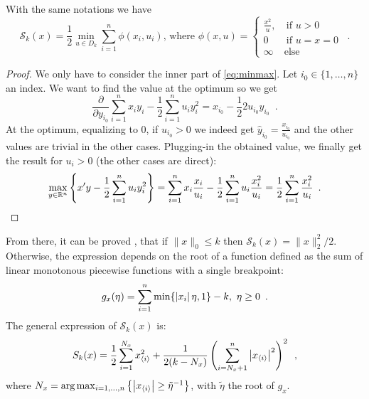 \begin{proposition} With the same notations we have 
\begin{equation}\mathcal{S}_k(x) = \frac{1}{2}\min_{u\in D_k} \sum_{i=1}^n \phi(x_i, u_i)\text{, where }
\phi(x,u)=\begin{cases}\frac{x^2}{u},&\ \text{if }u>0\\ 0&\ \text{if }u=x=0\\ \infty &\text{else} \end{cases}\enspace.\end{equation}
\end{proposition}
\begin{proof}
We only have to consider the inner part of \eqref{eq:minmax}. Let $i_0\in\{1,\dots,n\}$ an index. We want to find the value at the optimum so we get
\[ \frac{\partial}{\partial y_{i_0}} \sum_{i=1}^n x_iy_i -\frac{1}{2}\sum_{i=1}^n u_iy_i^2 = x_{i_0} - \frac{1}{2}2u_{i_0}y_{i_0}\enspace.\]
At the optimum, equalizing to $0$, if $u_{i_0}>0$ we indeed get $\hat y_{i_0} = \frac{x_{i_0}}{u_{i_0}}$ and the other values are trivial in the other cases. Plugging-in the obtained value, we finally get the result for $u_i>0$ (the other cases are direct):
\[\max_{y\in\mathbb{R}^n}\left\{x'y - \frac{1}{2}\sum_{i=1}^nu_iy_i^2\right\} = \sum_{i=1}^nx_i \frac{x_i}{u_i} - \frac{1}{2}\sum_{i=1}^n u_i \frac{x_i^2}{u_i} = \frac{1}{2}\sum_{i=1}^n \frac{x_i^2}{u_i}\enspace.\]
\end{proof}

From there, it can be proved \cite{beck}, that if $\|x\|_0\leq k$ then $\mathcal{S}_k(x)=\|x\|_2^2 /2$. Otherwise, the expression depends on the root of a function defined as the sum of linear monotonous piecewise functions with a single breakpoint:
\[g_x(\eta)=\sum_{i=1}^n \min\{\left|x_i\right|\eta,1\} - k,\ \eta\geq 0\enspace.\]
The general expression of $\mathcal{S}_k(x)$ is:
\begin{equation}
    S_k(x)=\frac{1}{2}\sum_{i=1}^{N_x} x_{\langle i \rangle}^2 + \frac{1}{2(k- N_x)}\left(\sum_{i=N_x+1}^n\left|x_{\langle i\rangle}\right|^2\right)^2\enspace,
\end{equation}
where $N_x=\arg\max_{i=1,\dots,n}\left\{\left|x_{\langle i\rangle}\right|\geq\tilde\eta ^{-1}\right\}$, with $\tilde \eta$ the root of $g_x$.